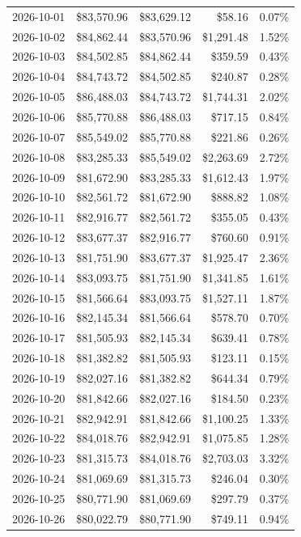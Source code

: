 \documentclass[11pt,a4paper]{article}
\begin{document}
{\begin{longtable}{rrrrr}
2026-10-01 & \$83,570.96 & \$83,629.12 & \$58.16 & 0.07\% \\
2026-10-02 & \$84,862.44 & \$83,570.96 & \$1,291.48 & 1.52\% \\
2026-10-03 & \$84,502.85 & \$84,862.44 & \$359.59 & 0.43\% \\
2026-10-04 & \$84,743.72 & \$84,502.85 & \$240.87 & 0.28\% \\
2026-10-05 & \$86,488.03 & \$84,743.72 & \$1,744.31 & 2.02\% \\
2026-10-06 & \$85,770.88 & \$86,488.03 & \$717.15 & 0.84\% \\
2026-10-07 & \$85,549.02 & \$85,770.88 & \$221.86 & 0.26\% \\
2026-10-08 & \$83,285.33 & \$85,549.02 & \$2,263.69 & 2.72\% \\
2026-10-09 & \$81,672.90 & \$83,285.33 & \$1,612.43 & 1.97\% \\
2026-10-10 & \$82,561.72 & \$81,672.90 & \$888.82 & 1.08\% \\
2026-10-11 & \$82,916.77 & \$82,561.72 & \$355.05 & 0.43\% \\
2026-10-12 & \$83,677.37 & \$82,916.77 & \$760.60 & 0.91\% \\
2026-10-13 & \$81,751.90 & \$83,677.37 & \$1,925.47 & 2.36\% \\
2026-10-14 & \$83,093.75 & \$81,751.90 & \$1,341.85 & 1.61\% \\
2026-10-15 & \$81,566.64 & \$83,093.75 & \$1,527.11 & 1.87\% \\
2026-10-16 & \$82,145.34 & \$81,566.64 & \$578.70 & 0.70\% \\
2026-10-17 & \$81,505.93 & \$82,145.34 & \$639.41 & 0.78\% \\
2026-10-18 & \$81,382.82 & \$81,505.93 & \$123.11 & 0.15\% \\
2026-10-19 & \$82,027.16 & \$81,382.82 & \$644.34 & 0.79\% \\
2026-10-20 & \$81,842.66 & \$82,027.16 & \$184.50 & 0.23\% \\
2026-10-21 & \$82,942.91 & \$81,842.66 & \$1,100.25 & 1.33\% \\
2026-10-22 & \$84,018.76 & \$82,942.91 & \$1,075.85 & 1.28\% \\
2026-10-23 & \$81,315.73 & \$84,018.76 & \$2,703.03 & 3.32\% \\
2026-10-24 & \$81,069.69 & \$81,315.73 & \$246.04 & 0.30\% \\
2026-10-25 & \$80,771.90 & \$81,069.69 & \$297.79 & 0.37\% \\
2026-10-26 & \$80,022.79 & \$80,771.90 & \$749.11 & 0.94\% \\

\end{longtable}}
\end{document}
